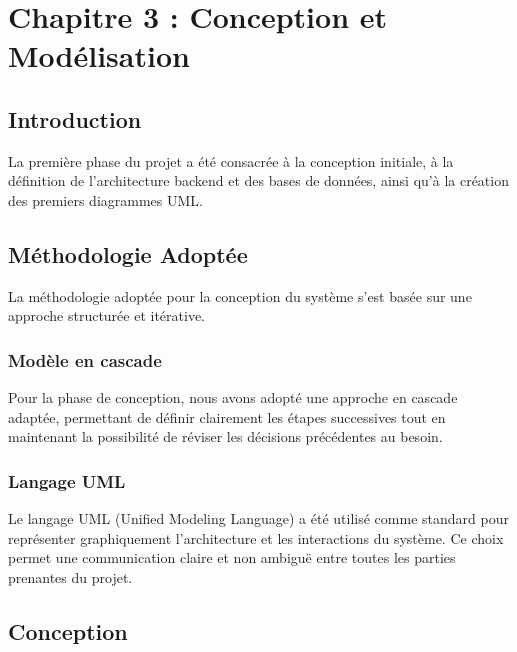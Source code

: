 \chapter*{Chapitre 3 : Conception et Modélisation}
\thispagestyle{fancy}
\setcounter{section}{0}
\newpage

\section{Introduction}
La première phase du projet a été consacrée à la conception initiale, à la définition de l'architecture backend et des bases de données, ainsi qu'à la création des premiers diagrammes UML.

\section{Méthodologie Adoptée}
La méthodologie adoptée pour la conception du système s'est basée sur une approche structurée et itérative.

\subsection{Modèle en cascade}
Pour la phase de conception, nous avons adopté une approche en cascade adaptée, permettant de définir clairement les étapes successives tout en maintenant la possibilité de réviser les décisions précédentes au besoin.

\subsection{Langage UML}
Le langage UML (Unified Modeling Language) a été utilisé comme standard pour représenter graphiquement l'architecture et les interactions du système. Ce choix permet une communication claire et non ambiguë entre toutes les parties prenantes du projet.

\section{Conception}

